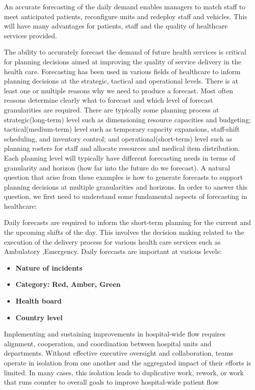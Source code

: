 \documentclass[
  authoryear,
  preprint,
  3p]{elsarticle}
\begin{document}
An accurate forecasting of the daily demand enables managers to match
staff to meet anticipated patients, reconfigure units and redeploy staff
and vehicles. This will have many advantages for patients, staff and the
quality of healthcare services provided.

The ability to accurately forecast the demand of future health services
is critical for planning decisions aimed at improving the quality of
service delivery in the health care. Forecasting has been used in
various fields of healthcare to inform planning decisions at the
strategic, tactical and operational levels. There is at least one or
multiple reasons why we need to produce a forecast. Most often reasons
determine clearly what to forecast and which level of forecast
granularities are required. There are typically some planning process at
strategic(long-term) level such as dimensioning resource capacities and
budgeting; tactical(medium-term) level such as temporary capacity
expansions, staff-shift scheduling, and inventory control; and
operational(short-term) level such as planning rosters for staff and
allocate resources and medical item distribution. Each planning level
will typically have different forecasting needs in terms of granularity
and horizon (how far into the future do we forecast). A natural question
that arise from these examples is how to generate forecasts to support
planning decisions at multiple granularities and horizons. In order to
answer this question, we first need to understand some fundamental
aspects of forecasting in healthcare:

Daily forecasts are required to inform the short-term planning for the
current and the upcoming shifts of the day. This involves the decision
making related to the execution of the delivery process for various
health care services such as Ambulatory ,Emergency. Daily forecasts are
important at various levels:

\begin{itemize}
\item
  \textbf{Nature of incidents}
\item
  \textbf{Category: Red, Amber, Green}
\item
  \textbf{Health board}
\item
  \textbf{Country level}
\end{itemize}

Implementing and sustaining improvements in hospital-wide flow requires
alignment, cooperation, and coordination between hospital units and
departments. Without effective executive oversight and collaboration,
teams operate in isolation from one another and the aggregated impact of
their efforts is limited. In many cases, this isolation leads to
duplicative work, rework, or work that runs counter to overall goals to
improve hospital-wide patient flow
\end{document}

